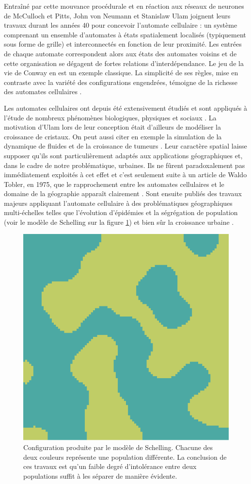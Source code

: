 \documentclass[12pt]{article}
\begin{document}
Entraîné par cette mouvance procédurale et en réaction aux réseaux de
neurones de McCulloch et Pitts, John von Neumann et Stanislaw Ulam
joignent leurs travaux durant les années 40 pour concevoir l'automate
cellulaire : un système comprenant un ensemble d'automates à états
spatialement localisés (typiquement sous forme de grille) et
interconnectés en fonction de leur proximité. Les entrées de chaque
automate correspondent alors aux états des automates voisins et de
cette organisation se dégagent de fortes relations
d'interdépendance. Le jeu de la vie de Conway en est un exemple
classique. La simplicité de ses règles, mise en contraste avec la
variété des configurations engendrées, témoigne de la richesse des
automates cellulaires \cite{Gardner1970}.

Les automates cellulaires ont depuis été extensivement étudiés et sont
appliqués à l'étude de nombreux phénomènes biologiques, physiques et
sociaux \cite{Ganguly2003}. La motivation d'Ulam lors de leur
conception était d'ailleurs de modéliser la croissance de cristaux. On
peut aussi citer en exemple la simulation de la dynamique de fluides
\cite{Frisch1986} et de la croissance de tumeurs
\cite{Kansal2000}. Leur caractère spatial laisse supposer qu'ils sont
particulièrement adaptés aux applications géographiques et, dans le
cadre de notre problématique, urbaines. Ils ne fûrent paradoxalement
pas immédiatement exploités à cet effet et c'est seulement suite à un
article de Waldo Tobler, en 1975, que le rapprochement entre les
automates cellulaires et le domaine de la géographie apparaît
clairement \cite{Tobler1975}. Sont ensuite publiés des travaux majeurs
appliquant l'automate cellulaire à des problématiques géographiques
multi-échelles telles que l'évolution d'épidémies \cite{Fu2003} et la
ségrégation de population \cite{Schelling1969} (voir le modèle de
Schelling sur la figure \ref{fig:schelling}) et bien sûr la croissance
urbaine \cite{Batty1997,Stevens2007}.

\begin{figure}[H]
  \centering
  \includegraphics[width=.5\linewidth]{images/schelling.png}
  \caption{Configuration produite par le modèle de Schelling. Chacune
    des deux couleurs représente une population différente. La
    conclusion de ces travaux est qu'un faible degré d'intolérance
    entre deux populations suffit à les séparer de manière évidente.}
  \label{fig:schelling}
\end{figure}
\end{document}
